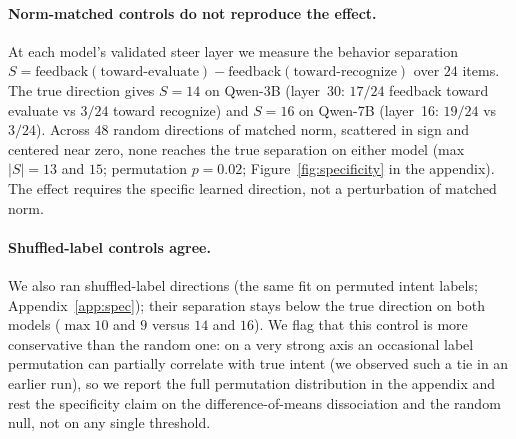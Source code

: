 \documentclass[11pt]{article}
\begin{document}
\paragraph{Norm-matched controls do not reproduce the effect.} At each model's validated steer layer we
measure the behavior separation $S = \mathrm{feedback}(\text{toward-evaluate}) -
\mathrm{feedback}(\text{toward-recognize})$ over $24$ items. The true direction gives $S{=}14$ on Qwen-3B
(layer~30: $17/24$ feedback toward evaluate vs $3/24$ toward recognize) and $S{=}16$ on Qwen-7B (layer~16:
$19/24$ vs $3/24$). Across $48$ random directions of matched norm, scattered in sign and centered near zero,
none reaches the true separation on either model (max $|S|{=}13$ and $15$; permutation $p{=}0.02$;
Figure~\ref{fig:specificity} in the appendix). The effect requires the specific learned direction, not a
perturbation of matched norm.

\paragraph{Shuffled-label controls agree.} We also ran shuffled-label directions (the same fit on permuted
intent labels; Appendix~\ref{app:spec}); their separation stays below the true direction on both models
($\max 10$ and $9$ versus $14$ and $16$). We flag that this control is more conservative than the random one:
on a very strong axis an occasional label permutation can partially correlate with true intent (we observed
such a tie in an earlier run), so we report the full permutation distribution in the appendix and rest the
specificity claim on the difference-of-means dissociation and the random null, not on any single threshold.
\end{document}
